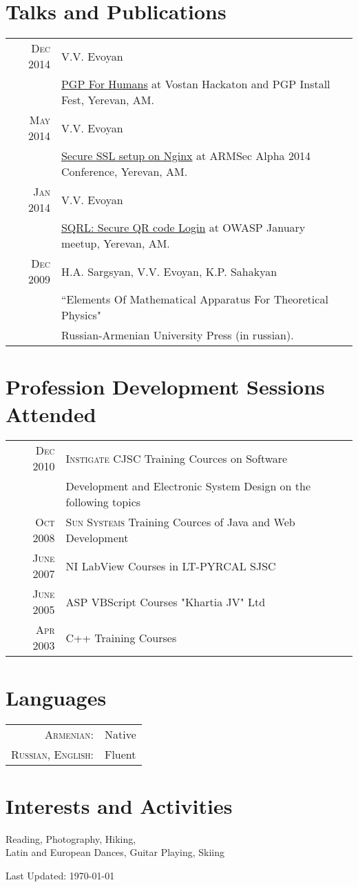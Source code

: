 \documentclass[a4paper,10pt]{article}
\begin{document}
\section{Talks and Publications}
\begin{tabular}{rl}
 \textsc{Dec} 2014 & V.V. Evoyan \\ & \href{http://vahe-evoyan.github.io/pgp-for-dummies/}{PGP For Humans} at Vostan Hackaton and PGP Install Fest, Yerevan, AM. \\
 \textsc{May} 2014 & V.V. Evoyan \\ & \href{http://vahe-evoyan.github.io/nginxssl-presentation/}{Secure SSL setup on Nginx} at ARMSec Alpha 2014 Conference, Yerevan, AM. \\
 \textsc{Jan} 2014 & V.V. Evoyan \\ & \href{https://prezi.com/qpgpm6zuxirv/sqrl}{SQRL: Secure QR code Login} at OWASP January meetup, Yerevan, AM. \\
 \textsc{Dec} 2009 & H.A. Sargsyan, V.V. Evoyan, K.P. Sahakyan \\ & ``Elements
 Of Mathematical Apparatus For Theoretical Physics" \\ & Russian-Armenian
 University Press (in russian).
\end{tabular}

\section{Profession Development Sessions Attended}
\begin{tabular}{rl}
\textsc{Dec} 2010 & \textsc{Instigate CJSC} Training Cources on Software \\
                  & Development and Electronic System Design on the following topics \\
\textsc{Oct} 2008 & \textsc{Sun Systems} Training Cources of Java and Web
					Development \\
\textsc{June} 2007 & NI LabView Courses in LT-PYRCAL SJSC \\
\textsc{June} 2005 & ASP VBScript Courses "Khartia JV" Ltd \\
\textsc{Apr} 2003 & C++ Training Courses

\end{tabular}


\section{Languages}
\begin{tabular}{rl}
 \textsc{Armenian:}&Native\\
 \textsc{Russian, English:}&Fluent\\
\end{tabular}

\section{Interests and Activities}
Reading, Photography, Hiking,  \\
Latin and European Dances, Guitar Playing, Skiing

\vfill
\hfill \footnotesize{Last Updated: \mydate\today }
\end{document}
